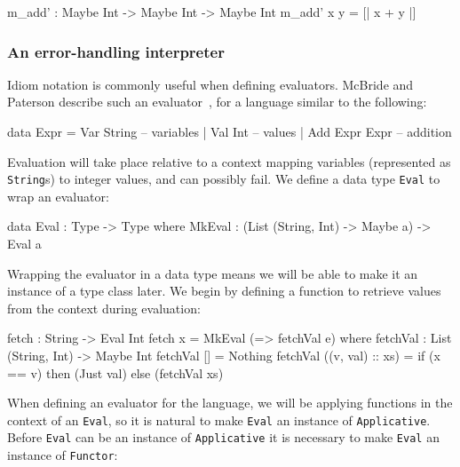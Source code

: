 \begin{code}
m_add' : Maybe Int -> Maybe Int -> Maybe Int
m_add' x y = [| x + y |]
\end{code} 

\subsubsection{An error-handling interpreter}

Idiom notation is commonly useful when defining evaluators. McBride and
Paterson describe such an evaluator~\cite{idioms}, for a language similar to
the following:

\begin{code}
data Expr = Var String      -- variables
          | Val Int         -- values
          | Add Expr Expr   -- addition
\end{code} 

\noindent
Evaluation will take place relative to a context mapping variables (represented as
\texttt{String}s) to integer values, and can possibly fail. We define a data type
\texttt{Eval} to wrap an evaluator:

\begin{code}
data Eval : Type -> Type where
     MkEval : (List (String, Int) -> Maybe a) -> Eval a
\end{code} 

\noindent
Wrapping the evaluator in a data type means we will be able to make it an instance
of a type class later. We begin by defining a function to retrieve values from
the context during evaluation:

\begin{code}
fetch : String -> Eval Int
fetch x = MkEval (\e => fetchVal e) where
    fetchVal : List (String, Int) -> Maybe Int
    fetchVal [] = Nothing
    fetchVal ((v, val) :: xs) = if (x == v) then (Just val) else (fetchVal xs)
\end{code} 
  
\noindent
When defining an evaluator for the language, we will be applying functions in
the context of an \texttt{Eval}, so it is natural to make \texttt{Eval} an
instance of \texttt{Applicative}.
Before \texttt{Eval} can be an instance of
\texttt{Applicative} it is necessary to make \texttt{Eval} an instance of
\texttt{Functor}:


